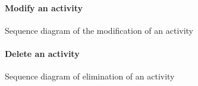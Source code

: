 \documentclass[12pt,titlepage]{article}
\begin{document}
\begin{figure}
\paragraph{Modify an activity}
\centering
{} 
\caption{Sequence diagram of the modification of an activity}
\end{figure}

\begin{figure}
\paragraph{Delete an activity}
\centering
{} 
\caption{Sequence diagram of elimination of an activity}
\end{figure}
\end{document}
